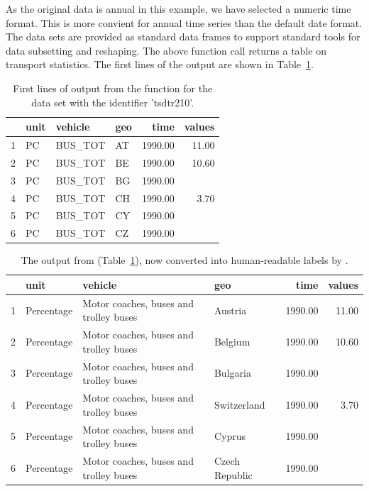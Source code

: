 As the original data is annual in this example, we have selected a
numeric time format. This is more convient for annual time series than
the default date format. The data sets are provided as standard data
frames to support standard tools for data subsetting and
reshaping. The above function call returns a table on transport
statistics.  The first lines of the output are shown in
Table~\ref{tab:getdatatable}.

\begin{table}[ht!]
\centering
\begin{tabular}{rlllrr}
\toprule
  \hline
 & unit & vehicle & geo & time & values \\ 
  \hline
  1 & PC & BUS\_TOT & AT & 1990.00 & 11.00 \\ 
  2 & PC & BUS\_TOT & BE & 1990.00 & 10.60 \\ 
  3 & PC & BUS\_TOT & BG & 1990.00 &  \\ 
  4 & PC & BUS\_TOT & CH & 1990.00 & 3.70 \\ 
  5 & PC & BUS\_TOT & CY & 1990.00 &  \\ 
  6 & PC & BUS\_TOT & CZ & 1990.00 &  \\ 
   \hline
\bottomrule   
\end{tabular}
\caption{First lines of output from the  function for the data set with the identifier 'tsdtr210'.}
\label{tab:getdatatable}
\end{table}

\begin{table}[h!]
\centering
\begin{tabular}{rlllrr}
\toprule
  \hline
  & unit & vehicle & geo & time & values \\ 
  \hline
  1 & Percentage & Motor coaches, buses and trolley buses & Austria & 1990.00 & 11.00 \\ 
  2 & Percentage & Motor coaches, buses and trolley buses & Belgium & 1990.00 & 10.60 \\ 
  3 & Percentage & Motor coaches, buses and trolley buses & Bulgaria & 1990.00 &  \\ 
  4 & Percentage & Motor coaches, buses and trolley buses & Switzerland & 1990.00 & 3.70 \\ 
  5 & Percentage & Motor coaches, buses and trolley buses & Cyprus & 1990.00 &  \\ 
  6 & Percentage & Motor coaches, buses and trolley buses & Czech Republic & 1990.00 &  \\ 
   \hline 
\bottomrule     
\end{tabular}
\caption{The output from  (Table~\ref{tab:getdatatable}), now converted into human-readable labels by .}
\label{tab:getdatatable2}
\end{table}


